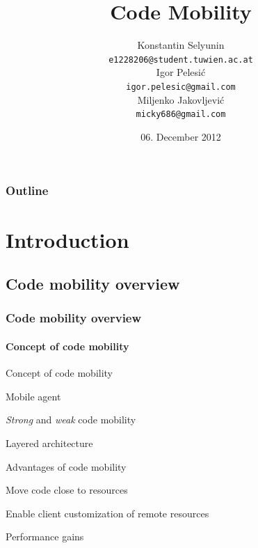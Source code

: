 \documentclass{beamer}
\title[Code Mobility]{Code Mobility}
\date{06. December 2012}
\author[Selyunin,Pelesi\'c,Jakovljevi\'c]{
 \Large{Konstantin Selyunin}\\
  \small{\texttt{e1228206@student.tuwien.ac.at}}\\
 \Large{Igor Pelesi\'c}\\
  \small{\texttt{igor.pelesic@gmail.com}}\\
 \Large{Miljenko Jakovljevi\'c}\\
  \small{\texttt{micky686@gmail.com}}\\
}
\theoremstyle{definition} \newtheorem{mdefinition}{Definition}
\theoremstyle{plain} \newtheorem{mtheorem}{Theorem}
\theoremstyle{plain} \newtheorem{mcorollary}{Corollary}
\theoremstyle{plain} \newtheorem{mfact}{Fact}
\begin{document}
\begin{frame}
	\titlepage
\end{frame}

\begin{frame}
	\frametitle{Outline}
	\tableofcontents
\end{frame}

\section{Introduction}


\subsection{Code mobility overview}
\begin{frame}
	\frametitle{Code mobility overview}
 		\framesubtitle{Concept of code mobility}
	\begin{block}{Concept of code mobility}
		\begin{description}
			\item	Mobile agent
			\item	{\it Strong} and {\it weak} code mobility
			\item   Layered architecture
		\end{description}
	\end{block}

	\begin{block}{Advantages of code mobility}
		\begin{description}
			\item	Move code close to resources 
			\item	Enable client customization of remote resources
			\item	Performance gains
		\end{description}
	\end{block}	
\cite{10.1109/32.685258, BartocciCMV06} 

\end{frame}
\end{document}
